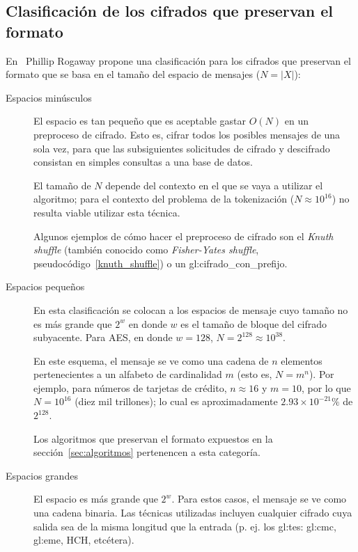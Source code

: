 \subsection{Clasificación de los cifrados que preservan el formato}

En~\cite{sinopsis_rogaway} Phillip Rogaway propone una clasificación para los
cifrados que preservan el formato que se basa en el tamaño del espacio de
mensajes ($ N = |X| $):

\begin{description}

  \item[Espacios minúsculos]

    El espacio es tan pequeño que es aceptable gastar $ O(N) $ en un preproceso
    de cifrado. Esto es, cifrar todos los posibles mensajes de una sola vez,
    para que las subsiguientes solicitudes de cifrado y descifrado consistan en
    simples consultas a una base de datos.

    El tamaño de $ N $ depende del contexto en el que se vaya a utilizar el
    algoritmo; para el contexto del problema de la tokenización
    ($ N \approx 10^{16} $) no resulta viable utilizar esta técnica.

    Algunos ejemplos de cómo hacer el preproceso de cifrado son el
    \textit{Knuth shuffle} (también conocido como \textit{Fisher-Yates shuffle},
    pseudocódigo~\ref{knuth_shuffle}) o un \gls{gl:cifrado_con_prefijo}.

  \item[Espacios pequeños]

    En esta clasificación se colocan a los espacios de mensaje cuyo tamaño
    no es más grande que $ 2^w $ en donde $ w $ es el tamaño de bloque del
    cifrado subyacente. Para AES, en donde $ w = 128 $, $ N = 2^{128}
    \approx 10^{38} $.

    En este esquema, el mensaje se ve como una cadena de $ n $ elementos
    pertenecientes a un alfabeto de cardinalidad $ m $ (esto es, $ N = m^n $).
    Por ejemplo, para números de tarjetas de crédito, $ n \approx 16 $ y
    $ m = 10 $, por lo que $ N = 10^{16} $ (diez mil trillones); lo cual es
    aproximadamente $ 2.93 \times 10^{-21} \% $ de $ 2^{128} $.

    Los algoritmos que preservan el formato expuestos en la
    sección~\ref{sec:algoritmos} pertenencen a esta categoría.

  \item[Espacios grandes]

    El espacio es más grande que $ 2^w $. Para estos casos, el mensaje se ve
    como una cadena binaria. Las técnicas utilizadas incluyen cualquier cifrado
    cuya salida sea de la misma longitud que la entrada (p. ej. los
    \gls{gl:tes}: \gls{gl:cmc}, \gls{gl:eme}, HCH, etcétera).

\end{description}

